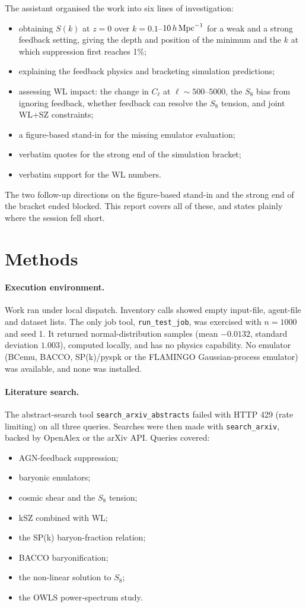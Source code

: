 \documentclass[11pt,a4paper]{article}
\begin{document}
The assistant organised the work into six lines of investigation:
\begin{itemize}
\item obtaining $S(k)$ at $z=0$ over $k=0.1$--$10\,h\,{\rm Mpc}^{-1}$ for a weak and a strong feedback setting, giving the depth and position of the minimum and the $k$ at which suppression first reaches 1\%;
\item explaining the feedback physics and bracketing simulation predictions;
\item assessing WL impact: the change in $C_\ell$ at $\ell\sim500$--$5000$, the $S_8$ bias from ignoring feedback, whether feedback can resolve the $S_8$ tension, and joint WL+SZ constraints;
\item a figure-based stand-in for the missing emulator evaluation;
\item verbatim quotes for the strong end of the simulation bracket;
\item verbatim support for the WL numbers.
\end{itemize}
The two follow-up directions on the figure-based stand-in and the strong end of the bracket ended blocked. This report covers all of these, and states plainly where the session fell short.

\section{Methods}
\paragraph{Execution environment.} Work ran under local dispatch. Inventory calls showed empty input-file, agent-file and dataset lists. The only job tool, \texttt{run\_test\_job}, was exercised with $n=1000$ and seed 1. It returned normal-distribution samples (mean $-0.0132$, standard deviation $1.003$), computed locally, and has no physics capability. No emulator (BCemu, BACCO, SP(k)/pyspk or the FLAMINGO Gaussian-process emulator) was available, and none was installed.

\paragraph{Literature search.} The abstract-search tool \texttt{search\_arxiv\_abstracts} failed with HTTP 429 (rate limiting) on all three queries. Searches were then made with \texttt{search\_arxiv}, backed by OpenAlex or the arXiv API. Queries covered:
\begin{itemize}
\item AGN-feedback suppression;
\item baryonic emulators;
\item cosmic shear and the $S_8$ tension;
\item kSZ combined with WL;
\item the SP(k) baryon-fraction relation;
\item BACCO baryonification;
\item the non-linear solution to $S_8$;
\item the OWLS power-spectrum study.
\end{itemize}
\end{document}
